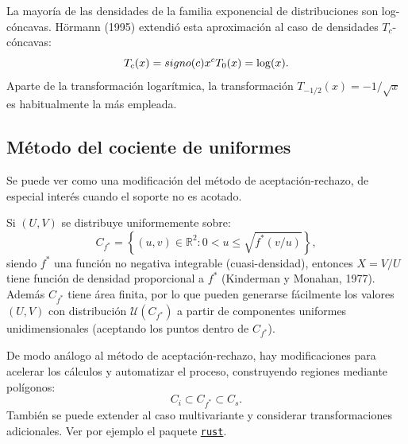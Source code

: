 \documentclass[
]{book}
\theoremstyle{break}
\theoremstyle{nonumberplain}
\begin{document}
La mayoría de las densidades de la familia exponencial de distribuciones son log-cóncavas.
Hörmann (1995) extendió esta aproximación al caso de densidades \(T_{c}\)-cóncavas:
\[T_{c}(x) = signo(c)x^{c} \\ T_{0}(x) = \log (x).\]
Aparte de la transformación logarítmica, la transformación \(T_{-1/2}(x)=-1/\sqrt{x}\) es habitualmente la más empleada.

\hypertarget{muxe9todo-del-cociente-de-uniformes}{%
\subsection{Método del cociente de uniformes}\label{muxe9todo-del-cociente-de-uniformes}}

Se puede ver como una modificación del método de aceptación-rechazo, de especial interés cuando el soporte no es acotado.

Si \((U,V)\) se distribuye uniformemente sobre:
\[C_{f^{\ast}} = \left\{ (u, v) \in \mathbb{R}^{2} : 
0<u\leq \sqrt{f^{\ast}(v/u)} \right\},\]
siendo \(f^{\ast}\) una función no negativa integrable (cuasi-densidad), entonces \(X=V/U\) tiene función de densidad proporcional a \(f^{\ast}\) (Kinderman y Monahan, 1977).
Además \(C_{f^{\ast}}\) tiene área finita, por lo que pueden generarse fácilmente los valores \((U,V)\) con distribución \(\mathcal{U}\left(C_{f^{\ast}}\right)\) a partir de componentes uniformes unidimensionales (aceptando los puntos dentro de \(C_{f^{\ast}}\)).

De modo análogo al método de aceptación-rechazo, hay modificaciones para acelerar los cálculos y automatizar el proceso, construyendo regiones mediante polígonos:
\[C_{i}\subset C_{f^{\ast}}\subset C_{s}.\]
También se puede extender al caso multivariante y considerar transformaciones adicionales.
Ver por ejemplo el paquete \href{https://paulnorthrop.github.io/rust/index.html}{\texttt{rust}}.
\end{document}
